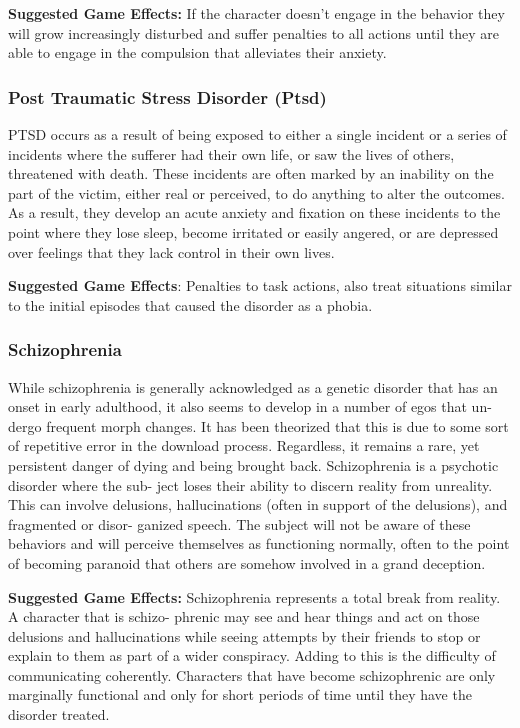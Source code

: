 \textbf{Suggested Game Effects: }If the character doesn't 
engage in the behavior they will grow increasingly 
disturbed and suffer penalties to all actions until they 
are able to engage in the compulsion that alleviates 
their anxiety.

\subsubsection{Post Traumatic Stress Disorder (Ptsd)}

PTSD occurs as a result of being exposed to either 
a single incident or a series of incidents where the 
sufferer had their own life, or saw the lives of others, 
threatened with death. These incidents are often 
marked by an inability on the part of the victim, either 
real or perceived, to do anything to alter the outcomes. 
As a result, they develop an acute anxiety and fixation 
on these incidents to the point where they lose sleep, 
become irritated or easily angered, or are depressed 
over feelings that they lack control in their own lives.

\textbf{Suggested Game Effects}: Penalties to task actions, 
also treat situations similar to the initial episodes that 
caused the disorder as a phobia.

\subsubsection{Schizophrenia}

While schizophrenia is generally acknowledged as a 
genetic disorder that has an onset in early adulthood, 
it also seems to develop in a number of egos that un-
dergo frequent morph changes. It has been theorized 
that this is due to some sort of repetitive error in the 
download process. Regardless, it remains a rare, yet 
persistent danger of dying and being brought back. 
Schizophrenia is a psychotic disorder where the sub-
ject loses their ability to discern reality from unreality. 
This can involve delusions, hallucinations (often in 
support of the delusions), and fragmented or disor-
ganized speech. The subject will not be aware of these 
behaviors and will perceive themselves as functioning 
normally, often to the point of becoming paranoid that 
others are somehow involved in a grand deception.

\textbf{Suggested Game Effects: }Schizophrenia represents 
a total break from reality. A character that is schizo-
phrenic may see and hear things and act on those 
delusions and hallucinations while seeing attempts 
by their friends to stop or explain to them as part 
of a wider conspiracy. Adding to this is the difficulty 
of communicating coherently. Characters that have 
become schizophrenic are only marginally functional 
and only for short periods of time until they have the 
disorder treated.

